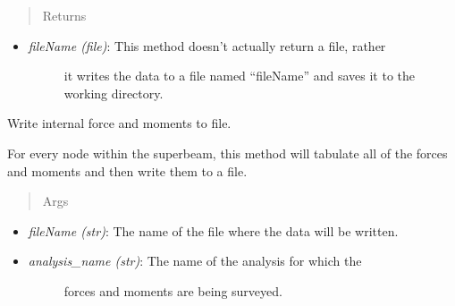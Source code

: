 \documentclass[letterpaper,10pt,english]{sphinxmanual}
\begin{document}
\begin{fulllineitems}
\begin{fulllineitems}
\begin{itemize}
\begin{description}
\end{description}

\end{itemize}
\begin{quote}\begin{description}
\item[{Returns}] \leavevmode
\end{description}\end{quote}
\begin{itemize}
\item {} \begin{description}
\item[{\emph{fileName (file)}: This method doesn't actually return a file, rather}] \leavevmode
it writes the data to a file named ``fileName'' and saves it to the
working directory.

\end{description}

\end{itemize}

\end{fulllineitems}


\begin{fulllineitems}
\label{structures:AeroComBAT.Structures.SuperBeam.writeForcesMoments}
Write internal force and moments to file.

For every node within the superbeam, this method will tabulate all of
the forces and moments and then write them to a file.
\begin{quote}\begin{description}
\item[{Args}] \leavevmode
\end{description}\end{quote}
\begin{itemize}
\item {} 
\emph{fileName (str)}: The name of the file where the data will be written.

\item {} \begin{description}
\item[{\emph{analysis\_name (str)}: The name of the analysis for which the}] \leavevmode
forces and moments are being surveyed.

\end{description}


\end{itemize}
\end{fulllineitems}
\end{fulllineitems}
\end{document}
